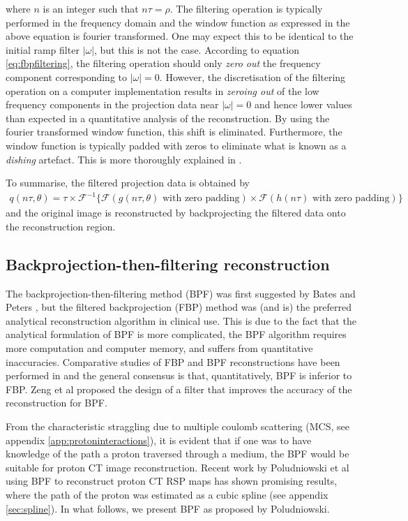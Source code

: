 \documentclass[11pt,a4paper]{article}
\begin{document}
where $n$ is an integer such that $n\tau = \rho$. The filtering operation is typically performed in the frequency domain and the window function as expressed in the above equation is fourier transformed. One may expect this to be identical to the initial ramp filter $|\omega|$, but this is not the case. According to equation \ref{eq:fbpfiltering}, the filtering operation should only \textit{zero out} the frequency component corresponding to $|\omega| = 0$. However, the discretisation of the filtering operation on a computer implementation results in \textit{zeroing out} of the low frequency components in the projection data near $|\omega| = 0$ and hence lower values than expected in a quantitative analysis of the reconstruction. By using the fourier transformed window function, this shift is eliminated. Furthermore, the window function is typically padded with zeros to eliminate what is known as a \textit{dishing} artefact. This is more thoroughly explained in \cite{avinash1988principles}.

To summarise, the filtered projection data is obtained by
\begin{align}
q(n\tau, \theta) = \tau \times \mathcal{F}^{-1} \{ \mathcal{F} (g(n\tau, \theta) \text{ with zero padding}) 
\times \mathcal{F}( h(n\tau) \text{ with zero padding})\}
\end{align}
and the original image is reconstructed by backprojecting the filtered data onto the reconstruction region.

\subsection{Backprojection-then-filtering reconstruction}
\label{sec:bpf}
The backprojection-then-filtering method (BPF) was first suggested by Bates and Peters \cite{bates1971towards}, but the filtered backprojection (FBP) method was (and is) the preferred analytical reconstruction algorithm in clinical use. This is due to the fact that the analytical formulation of BPF is more complicated, the BPF algorithm requires more computation and computer memory, and suffers from quantitative inaccuracies. Comparative studies of FBP and BPF reconstructions have been performed in \cite{suzuki1988comparison} and the general consensus is that, quantitatively, BPF is inferior to FBP. Zeng et al \cite{zeng1995can} proposed the design of a filter that improves the accuracy of the reconstruction for BPF. 

From the characteristic straggling due to multiple coulomb scattering (MCS, see appendix \ref{app:protoninteractions}), it is evident that if one was to have knowledge of the path a proton traversed through a medium, the BPF would be suitable for proton CT image reconstruction. Recent work by Poludniowski et al \cite{poludniowski2014proton} using BPF to reconstruct proton CT RSP maps has shown promising results, where the path of the proton was estimated as a cubic spline (see appendix \ref{sec:spline}). In what follows, we present BPF as proposed by Poludniowski. 
\end{document}

